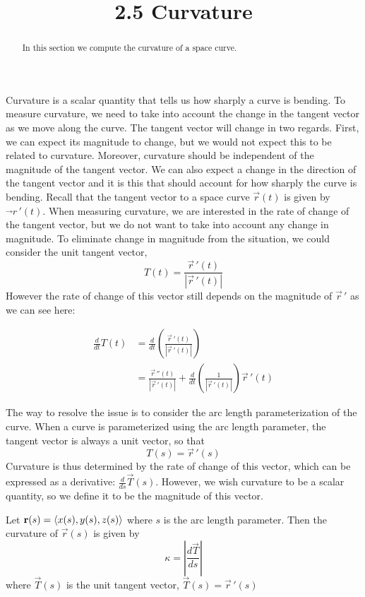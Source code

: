 \documentclass[handout]{ximera}
\title{2.5 Curvature}
\begin{document}
\begin{abstract}
In this section we compute the curvature of a space curve.
\end{abstract}

\maketitle

Curvature is a scalar quantity that tells us how sharply a curve is bending.
To measure curvature, we need to take into account the change in the tangent vector as we move along the curve.
The tangent vector will change in two regards. First, we can expect its magnitude to change, but
we would not expect this to be related to curvature. Moreover, curvature should be independent of the magnitude of the tangent vector.
We can also expect a change in the direction of the tangent vector and it is this 
that should account for how sharply the curve is bending.
Recall that the tangent vector to a space curve $\vec r(t)$ is given by $\vec\,r\,'(t)$.
When measuring curvature, we are interested in the rate of change of the tangent vector, but we do not want to take into account any change in magnitude.
To eliminate change in magnitude from the situation, we could consider the unit tangent vector, 
\[
T(t) = \frac{\vec r\,'(t) }{|\vec r\,'(t)|}
\]
However the rate of change of this vector still depends on the magnitude of $\vec r\,'$ as we can see here:

\begin{align*}
\frac{d}{dt} T(t) &= \frac{d}{dt} \left(\frac{\vec r\,'(t) }{|\vec r\,'(t)|}\right) \\
&= \frac{\vec r\,''(t) }{|\vec r\,'(t)|} + \frac{d}{dt} \left( \frac{1}{|\vec r\,'(t)|}\right)\vec r\,'(t)
\end{align*}

The way to resolve the issue is to consider the arc length parameterization of the curve.
When a curve is parameterized using the arc length parameter, the tangent vector is always a unit vector, so that
\[
T(s) = \vec r\,'(s)
\]
Curvature is thus determined by the rate of change of this vector, which can be expressed as a derivative: $\frac{d}{ds} \vec T(s)$.  
However, we wish curvature to be a scalar quantity, so we define it to be the magnitude of this vector.
\begin{definition}[Curvature]
Let $\mathbf r(s) = \left\langle x(s), y(s), z(s)\right\rangle$ where $s$ is the arc length parameter. Then the curvature of $\vec r(s)$ is given by 
\[
\kappa = \left|\frac{d\vec T}{ds}\right|
\]
where $\vec T(s)$ is the unit tangent vector, $\vec T(s) = \vec r\,'(s)$ 
\end{definition}
\end{document}
